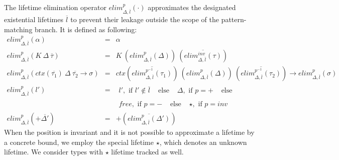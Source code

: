 \documentclass[11pt]{article}
\newcommand{\ap}{~}
\newcommand{\ctx}[1]{ctx\left(#1\right)~}
\begin{document}
    The lifetime elimination operator $elim_{\Delta, \overline{l}}^p(\cdot)$ approximates the designated existential lifetimes $\overline{l}$ to prevent their leakage outside the scope of the pattern-matching branch.
    It is defined as following: %
    \[
        \begin{array}{lll}
            elim_{\Delta, \overline{l}}^p(\alpha) & = & \alpha \\
            elim_{\Delta, \overline{l}}^p(K\ap \Delta\ap\overline{\tau}) & = & K\ap \left( elim_{\Delta, \overline{l}}^p(\Delta) \right)\ap\left( \overline{elim_{\Delta, \overline{l}}^{inv}(\tau)} \right) \\
            elim_{\Delta, \overline{l}}^p(\ctx{\overline{\tau_1}}\Delta~\overline{\tau_2}\to\sigma) & = & \ctx{\overline{elim_{\Delta, \overline{l}}^{p^{-1}}(\tau_1)}} \left( elim_{\Delta, \overline{l}}^p(\Delta) \right)\ap\left( \overline{elim_{\Delta, \overline{l}}^{p^{-1}}(\tau_2)} \right)\to elim_{\Delta, \overline{l}}^{p}(\sigma) \\
            elim_{\Delta, \overline{l}}^{p}(l') & = &
            \begin{array}{llll}
                l', \text{ if } l' \not\in\overline{l} & \text{ else } &
                \Delta, \text{ if } p = + & \text{ else }
            \end{array} \\
            &&
            \begin{array}{llll}
                free, \text{ if } p = - & \text{ else } &
                \star, \text{ if } p = inv
            \end{array} \\
            elim_{\Delta, \overline{l}}^{p}(+\overline{\Delta'}) & = & +\left( \overline{elim_{\Delta, \overline{l}}^{p}(\Delta')} \right)
        \end{array}
    \]
    When the position is invariant and it is not possible to approximate a lifetime by a concrete bound, we employ the special lifetime $\star$, which denotes an unknown lifetime.
    We consider types with $\star$ lifetime tracked as well.
\end{document}
